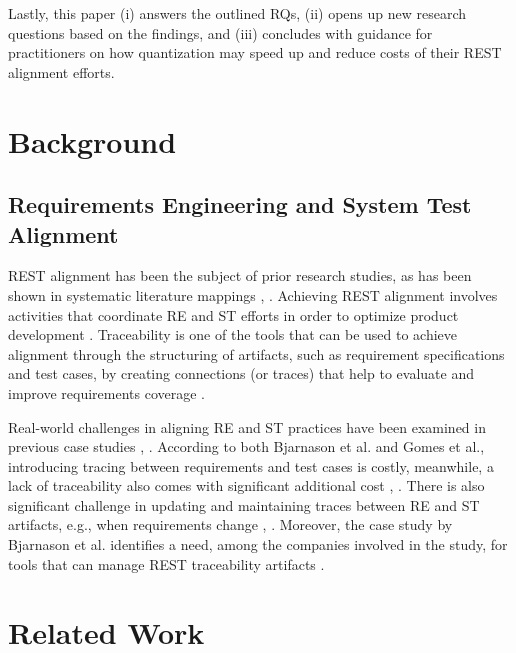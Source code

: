 \documentclass[conference]{IEEEtran}
\begin{document}
Lastly, this paper (i) answers the outlined RQs, (ii) opens up new research
questions based on the findings, and (iii) concludes with guidance for
practitioners on how quantization may speed up and reduce costs of their REST
alignment efforts.

\section{Background}\label{background}


\subsection{Requirements Engineering and System Test Alignment}

REST alignment has been the subject of prior research studies, as has been shown in
systematic literature mappings \cite{barmi2011Alignment}, \cite{karhaapa2017What}.
Achieving REST alignment involves activities that coordinate RE and ST efforts
in order to optimize product development \cite{unterkalmsteiner2014Taxonomy}.
Traceability is one of the tools that can be used to achieve alignment through
the structuring of artifacts, such as requirement specifications and test cases,
by creating connections (or traces) that help to evaluate and improve
requirements coverage \cite{bjarnason2014Challenges}.

Real-world challenges in aligning RE and ST practices have been examined in
previous case studies \cite{bjarnason2014Challenges},
\cite{gomes2017Challenges}. According to both Bjarnason et al. and Gomes et
al., introducing tracing between requirements and test cases is costly,
meanwhile, a lack of traceability also comes with significant additional cost
\cite{bjarnason2014Challenges}, \cite{gomes2017Challenges}. There is also
significant challenge in updating and maintaining traces between RE and ST
artifacts, e.g., when requirements change \cite{bjarnason2014Challenges},
\cite{gomes2017Challenges}. Moreover, the case study by Bjarnason et al.
identifies a need, among the companies involved in the study, for tools that can
manage REST traceability artifacts \cite{bjarnason2014Challenges}.

\section{Related Work}\label{relatedWork}
\end{document}
